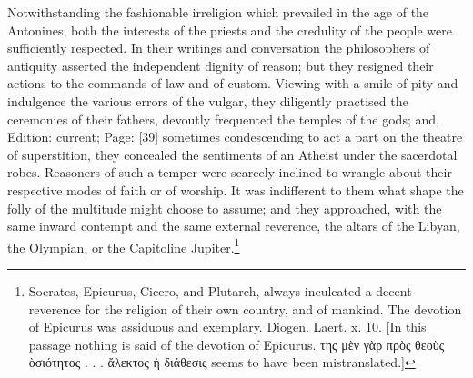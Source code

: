 Notwithstanding the fashionable irreligion which prevailed in the age of the Antonines, both the interests of the priests and the credulity of the people were sufficiently respected. In their writings and conversation the philosophers of antiquity asserted the independent dignity of reason; but they resigned their actions to the commands of law and of custom. Viewing with a smile of pity and indulgence the various errors of the vulgar, they diligently practised the ceremonies of their fathers, devoutly frequented the temples of the gods; and, Edition: current; Page: [39] sometimes condescending to act a part on the theatre of superstition, they concealed the sentiments of an Atheist under the sacerdotal robes. Reasoners of such a temper were scarcely inclined to wrangle about their respective modes of faith or of worship. It was indifferent to them what shape the folly of the multitude might choose to assume; and they approached, with the same inward contempt and the same external reverence, the altars of the Libyan, the Olympian, or the Capitoline Jupiter.\footnote{Socrates, Epicurus, Cicero, and Plutarch, always inculcated a decent reverence for the religion of their own country, and of mankind. The devotion of Epicurus was assiduous and exemplary. Diogen. Laert. x. 10. [In this passage nothing is said of the devotion of Epicurus. \textgreek{της μ\texthebrew{ὲ}ν γ\texthebrew{ὰ}ρ πρ\texthebrew{ὸ}ς θεο\texthebrew{ὺ}ς \texthebrew{ὸ}σιότητος . . . \texthebrew{ἄ}λεκτος \texthebrew{ὴ} διάθεσις} seems to have been mistranslated.]}

